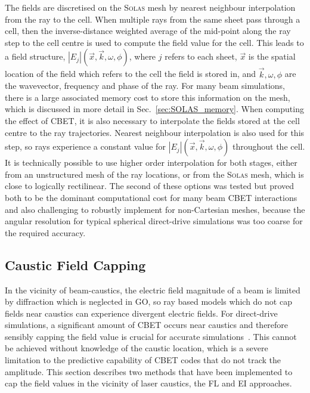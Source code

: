 The fields are discretised on the \textsc{Solas} mesh by nearest neighbour interpolation from the ray to the cell.
When multiple rays from the same sheet pass through a cell, then the inverse-distance weighted average of the mid-point along the ray step to the cell centre is used to compute the field value for the cell.
This leads to a field structure, $|E_j|(\vec{x},\vec{k},\omega,\phi)$, where $j$ refers to each sheet, $\vec{x}$ is the spatial location of the field which refers to the cell the field is stored in, and $\vec{k},\omega,\phi$ are the wavevector, frequency and phase of the ray.
For many beam simulations, there is a large associated memory cost to store this information on the mesh, which is discussed in more detail in Sec.~\ref{sec:SOLAS_memory}.
When computing the effect of \ac{CBET}, it is also necessary to interpolate the fields stored at the cell centre to the ray trajectories.
Nearest neighbour interpolation is also used for this step, so rays experience a constant value for $|E_j|(\vec{x},\vec{k},\omega,\phi)$ throughout the cell.
It is technically possible to use higher order interpolation for both stages, either from an unstructured mesh of the ray locations, or from the \textsc{Solas} mesh, which is close to logically rectilinear.
The second of these options was tested but proved both to be the dominant computational cost for many beam \ac{CBET} interactions and also challenging to robustly implement for non-Cartesian meshes, because the angular resolution for typical spherical direct-drive simulations was too coarse for the required accuracy.

\subsection{Caustic Field Capping}%
\label{sec:SOLAS_caustic_cap}
In the vicinity of beam-caustics, the electric field magnitude of a beam is limited by diffraction which is neglected in \ac{GO}, so ray based models which do not cap fields near caustics can experience divergent electric fields.
For direct-drive simulations, a significant amount of \ac{CBET} occurs near caustics and therefore sensibly capping the field value is crucial for accurate simulations~\cite{colaitis_adaptive_2019}.
This cannot be achieved without knowledge of the caustic location, which is a severe limitation to the predictive capability of \ac{CBET} codes that do not track the amplitude.
This section describes two methods that have been implemented to cap the field values in the vicinity of laser caustics, the \ac{FL} and \ac{EI} approaches.

